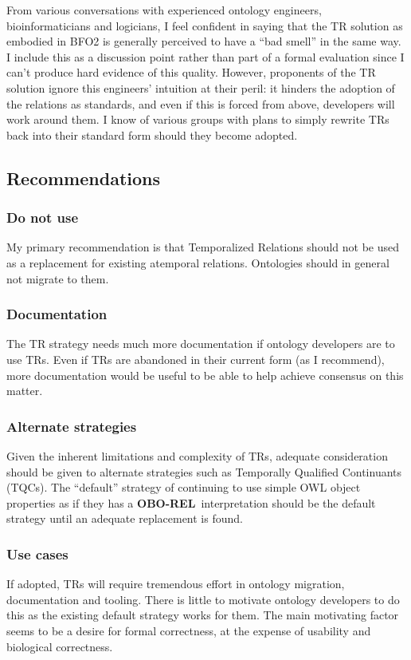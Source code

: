 \documentclass{bioinfo}
\def\OBOREL{\textbf{OBO-REL}}
\begin{document}
From various conversations with experienced ontology engineers,
bioinformaticians and logicians, I feel confident in saying that the
TR solution as embodied in BFO2 is generally perceived to have a ``bad
smell'' in the same way. I include this as a discussion point rather
than part of a formal evaluation since I can't produce hard evidence
of this quality. However, proponents of the TR solution ignore this
engineers' intuition at their peril: it hinders the adoption of the
relations as standards, and even if this is forced from above,
developers will work around them. I know of various groups with plans
to simply rewrite TRs back into their standard form should they become
adopted.

\subsection{Recommendations}

\subsubsection{Do not use} My primary recommendation is that
Temporalized Relations should not be used as a replacement for
existing atemporal relations. Ontologies should in general not migrate
to them.

\subsubsection{Documentation} The TR strategy needs much more
documentation if ontology developers are to use TRs. Even if TRs are
abandoned in their current form (as I recommend), more documentation
would be useful to be able to help achieve consensus on this matter.

\subsubsection{Alternate strategies} Given the inherent limitations
and complexity of TRs, adequate consideration should be given to
alternate strategies such as Temporally Qualified Continuants
(TQCs). The ``default'' strategy of continuing to use simple OWL
object properties as if they has a \OBOREL\ interpretation should be
the default strategy until an adequate replacement is found.

\subsubsection{Use cases} If adopted, TRs will require tremendous
effort in ontology migration, documentation and tooling. There is
little to motivate ontology developers to do this as the existing
default strategy works for them. The main motivating factor seems to
be a desire for formal correctness, at the expense of usability and
biological correctness. 
\end{document}
